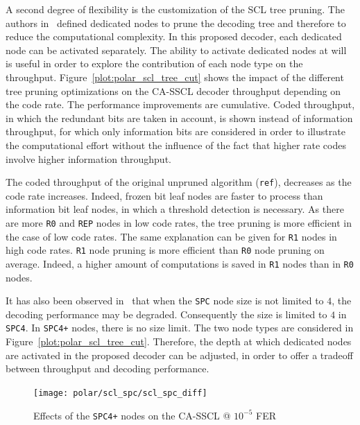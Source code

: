 A second degree of flexibility is the customization of the SCL tree pruning. The
authors in~\cite{Alamdar-Yazdi2011,Sarkis2016} defined dedicated nodes to prune
the decoding tree and therefore to reduce the computational complexity. In this
proposed decoder, each dedicated node can be activated separately. The ability
to activate dedicated nodes at will is useful in order to explore the
contribution of each node type on the throughput.
Figure~\ref{plot:polar_scl_tree_cut} shows the impact of the different tree
pruning optimizations on the CA-SSCL decoder throughput depending on the code
rate. The performance improvements are cumulative. Coded throughput, in which
the redundant bits are taken in account, is shown instead of information
throughput, for which only information bits are considered in order to
illustrate the computational effort without the influence of the fact that
higher rate codes involve higher information throughput.

The coded throughput of the original unpruned algorithm (\verb|ref|),
decreases as the code rate increases. Indeed, frozen bit leaf nodes are faster
to process than information bit leaf nodes, in which a threshold detection is
necessary. As there are more \verb|R0| and \verb|REP| nodes in low code rates,
the tree pruning is more efficient in the case of low code rates. The same
explanation can be given for \verb|R1| nodes in high code rates. \verb|R1| node
pruning is more efficient than \verb|R0| node pruning on average. Indeed, a
higher amount of computations is saved in \verb|R1| nodes than in \verb|R0|
nodes.

It has also been observed in~\cite{Sarkis2016} that when the \verb|SPC| node
size is not limited to $4$, the decoding performance may be degraded.
Consequently the size is limited to $4$ in \verb|SPC4|. In \verb|SPC4+|
nodes, there is no size limit. The two node types are considered in
Figure~\ref{plot:polar_scl_tree_cut}. Therefore, the depth at which dedicated
nodes are activated in the proposed decoder can be adjusted, in order to offer a
tradeoff between throughput and decoding performance.

\begin{figure}
  \centering
  \texttt{[image: polar/scl\_spc/scl\_spc\_diff]}
  \caption{Effects of the \texttt{SPC4+} nodes on the CA-SSCL @ $10^{-5}$ FER}
  \label{plot:polar_scl_spc}
\end{figure}

